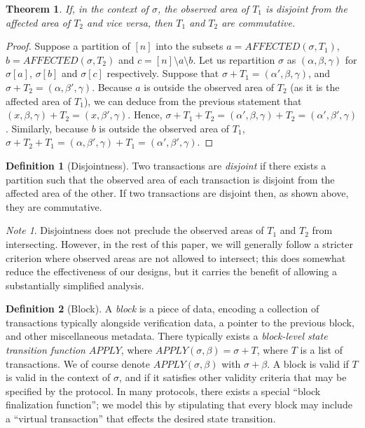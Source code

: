 \documentclass[11pt,a4paper]{report}
\theoremstyle{plain}
\newtheorem{thm}{Theorem}[section]
\theoremstyle{definition}
\newtheorem{defn}{Definition}[chapter]
\theoremstyle{remark}
\newtheorem*{note}{Note}
\begin{document}
\begin{thm}
If, in the context of $\sigma$, the observed area of $T_1$ is disjoint from the affected area of $T_2$ and vice versa, then $T_1$ and $T_2$ are commutative.
\end{thm}

\begin{proof}
Suppose a partition of $[n]$ into the subsets $a = AFFECTED(\sigma, T_1)$, $b = AFFECTED(\sigma, T_2)$ and $c = [n] \setminus a \setminus b$. Let us repartition $\sigma$ as $(\alpha, \beta, \gamma)$ for $\sigma[a]$, $\sigma[b]$ and $\sigma[c]$ respectively. Suppose that $\sigma + T_1 = (\alpha', \beta, \gamma)$, and $\sigma + T_2 = (\alpha, \beta', \gamma)$. Because $a$ is outside the observed area of $T_2$ (as it is the affected area of $T_1$), we can deduce from the previous statement that $(x, \beta, \gamma) + T_2 = (x, \beta', \gamma)$. Hence, $\sigma + T_1 + T_2 = (\alpha', \beta, \gamma) + T_2 = (\alpha', \beta', \gamma)$. Similarly, because $b$ is outside the observed area of $T_1$, $\sigma + T_2 + T_1 = (\alpha, \beta', \gamma) + T_1 = (\alpha', \beta', \gamma)$.
\end{proof}

\begin{defn}[Disjointness]
Two transactions are \emph{disjoint} if there exists a partition such that the observed area of each transaction is disjoint from the affected area of the other. If two transactions are disjoint then, as shown above, they are commutative.
\end{defn}

\begin{note}
Disjointness does not preclude the observed areas of $T_1$ and $T_2$ from intersecting. However, in the rest of this paper, we will generally follow a stricter criterion where observed areas are not allowed to intersect; this does somewhat reduce the effectiveness of our designs, but it carries the benefit of allowing a substantially simplified analysis.
\end{note}

\begin{defn}[Block]
A \emph{block} is a piece of data, encoding a collection of transactions typically alongside verification data, a pointer to the previous block, and other miscellaneous metadata. There typically exists a \emph{block-level state transition function} $APPLY$, where $APPLY(\sigma, \beta) = \sigma + T$, where $T$ is a list of transactions. We of course denote $APPLY(\sigma, \beta)$ with $\sigma + \beta$. A block is valid if $T$ is valid in the context of $\sigma$, and if it satisfies other validity criteria that may be specified by the protocol. In many protocols, there exists a special ``block finalization function''; we model this by stipulating that every block may include a ``virtual transaction'' that effects the desired state transition.
\end{defn}
\end{document}
